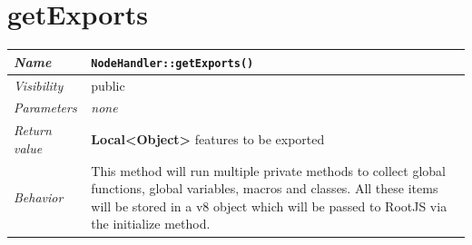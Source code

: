 \section{getExports}
\begin{longtable}{p{3cm} @{\hskip 1cm} p{12cm}}
 \hline
\textit{Name} & \texttt{NodeHandler::getExports()}\\
\hline
 \textit{Visibility} & public\\
\hline
\textit{Parameters} & \textit{none}\\
\hline
\textit{Return value} & \textbf{Local<Object>} features to be exported \\
  \hline
 \textit{Behavior} & This method will run multiple private methods to collect global functions, global variables, macros and classes.
 All these items will be stored in a v8 object which will be passed to RootJS via the initialize method. \\
\hline
\end{longtable} \pagebreak
